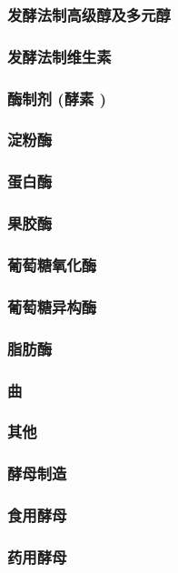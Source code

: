 \documentclass[UTF8]{../../ApplicationUniverse}
\begin{document}
    \subsubsection{发酵法制高级醇及多元醇}
    \subsubsection{发酵法制维生素}
    \subsubsection{酶制剂 (酵素 )}
        \subsubsection{淀粉酶}
        \subsubsection{蛋白酶}
        \subsubsection{果胶酶}
        \subsubsection{葡萄糖氧化酶}
        \subsubsection{葡萄糖异构酶}
        \subsubsection{脂肪酶}
        \subsubsection{曲}
        \subsubsection{其他}
    \subsubsection{酵母制造}
        \subsubsection{食用酵母}
        \subsubsection{药用酵母}
\end{document}
